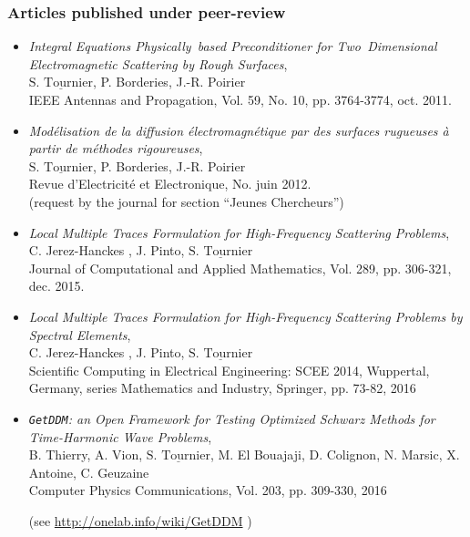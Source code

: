 \documentclass[a4paper,10pt,twoside]{article}
\newcommand{\categorie}[1]{\vspace*{0.1cm}\noindent%
	{\center  \colorbox[gray]{0.9}{\makebox[\textwidth][c]{\Large
              \sc {#1}}}\par}\vspace*{.5cm}}
\newcommand\moi{$\underline{\textrm{S. Tournier}}$}
\begin{document}
\medskip

\categorie{Publications}
\vspace{-0.65cm}
\subsubsection*{Articles published under peer-review}

\begin{itemize}
\item[\textbullet]
\emph{Integral Equations Physically~based Preconditioner for Two~Dimensional Electromagnetic Scattering by Rough Surfaces}, \\
 \moi , P. Borderies, J.-R. Poirier \\
\textsf{IEEE Antennas and Propagation},
Vol. 59, No. 10, pp. 3764-3774, oct. 2011. \\[-1ex]
\item[\textbullet]
\emph{Modélisation de la diffusion électromagnétique par des surfaces
  rugueuses à partir de méthodes rigoureuses},\\
\moi , P. Borderies, J.-R. Poirier \\
\textsf{R}evue d'\textsf{E}lectricité et \textsf{E}lectronique,
No. juin 2012.\\
(request by the journal for section ``Jeunes Chercheurs'')
\item[\textbullet]
\emph{Local Multiple Traces Formulation for High-Frequency Scattering Problems},\\
 C. Jerez-Hanckes , J. Pinto, \moi \\
 \textsf{Journal of Computational and Applied Mathematics},
 Vol. 289, pp. 306-321, dec. 2015. %
\item[\textbullet]
 \emph{Local Multiple Traces Formulation for High-Frequency Scattering
   Problems by Spectral Elements},\\
 C. Jerez-Hanckes , J. Pinto, \moi \\
\textsf{Scientific Computing in Electrical Engineering: SCEE 2014,
  Wuppertal, Germany},
series Mathematics and Industry, Springer,
 pp. 73-82, 2016
\item[\textbullet]
  \emph{\texttt{GetDDM}: an Open Framework for Testing Optimized Schwarz
    Methods for Time-Harmonic Wave Problems},\\
  B. Thierry, A. Vion, \moi, M. El Bouajaji,
  D. Colignon, N. Marsic, X. Antoine, C. Geuzaine\\
  \textsf{Computer Physics Communications},
  Vol. 203, pp. 309-330, 2016
  \begin{flushright}
    (see \url{http://onelab.info/wiki/GetDDM} )
  \end{flushright}
\end{itemize}
\end{document}
